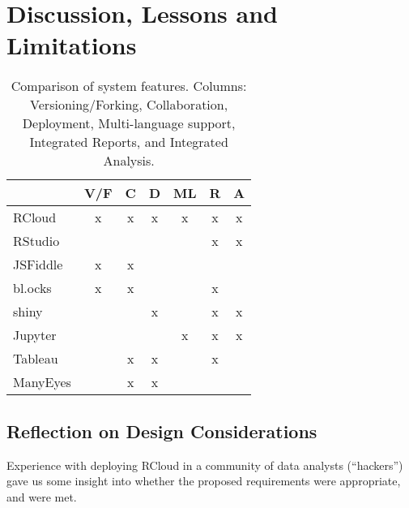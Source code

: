 \section{Discussion, Lessons and Limitations}
\label{sec:discussion}

\begin{table}
  \centering
  \begin{tabular}{l|cccccc}
    & V/F & C & D & ML & R & A \\
    \hline
RCloud     &       x            &       x       &     x      &      x        &           x        &           x         \\
RStudio    &                    &               &            &               &           x        &           x         \\
JSFiddle   &       x            &       x       &            &               &                    &                     \\
bl.ocks    &       x            &       x       &            &               &           x        &                     \\
shiny      &                    &               &     x      &               &           x        &           x         \\
Jupyter    &                    &               &            &      x        &           x        &           x         \\
Tableau    &                    &      x        &     x      &               &           x        &                     \\
ManyEyes   &                    &      x        &     x      &               &                    &                     
  \end{tabular}
  \caption{Comparison of system features. Columns: Versioning/Forking, Collaboration, Deployment, Multi-language support, Integrated Reports, and Integrated Analysis.}
\end{table}

\subsection{Reflection on Design Considerations}

Experience with deploying RCloud in a community of data analysts
(``hackers'') gave us some insight into whether the proposed
requirements were appropriate, and were met.

